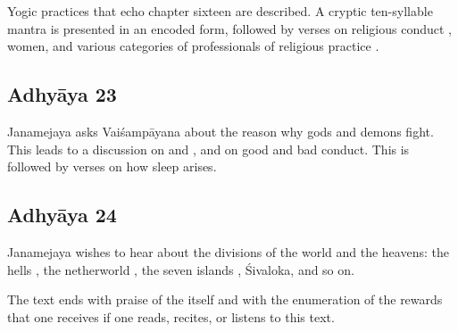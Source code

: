Yogic practices that echo chapter sixteen are described.
A cryptic ten-syllable mantra is presented in an encoded form, followed by
verses on religious conduct , women, and various categories of
professionals of religious practice .

\subsection*{Adhyāya 23}\label{contents_of_ch23}
Janamejaya asks Vaiśampāyana about the reason why gods and demons fight. 
This leads to a discussion on  and , and on good and bad conduct.
This is followed by verses on how sleep arises.

\subsection*{Adhyāya 24}\label{contents_of_ch24}
Janamejaya wishes to hear about the divisions of the world and the heavens: the hells ,
the netherworld , the seven islands , Śivaloka, and so on.

The text ends with praise of the  itself and with the enumeration of the rewards
that one receives if one reads, recites, or listens to this text.

\vfill
\pagebreak






